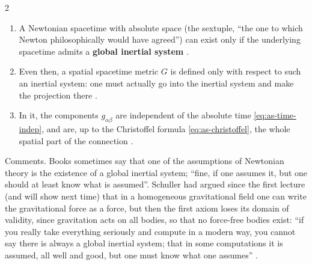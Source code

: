 \begin{paracol}{2}
\begin{theorem}\label{thm:as-summary}
\begin{enumerate}
  \item A Newtonian spacetime with absolute space (the sextuple, ``the one to which Newton philosophically would have agreed'') can exist only if the underlying spacetime admits a \textbf{global inertial system} .
  \item Even then, a spatial spacetime metric $G$ is defined only with respect to such an inertial system: one must actually go into the inertial system and make the projection there .
  \item In it, the components $g_{\alpha\beta}$ are independent of the absolute time \eqref{eq:as-time-indep}, and are, up to the Christoffel formula \eqref{eq:as-christoffel}, the whole spatial part of the connection .
\end{enumerate}
\end{theorem}
Comments. Books sometimes say that one of the assumptions of Newtonian theory is the existence of a global inertial system; ``fine, if one assumes it, but one should at least know what is assumed''. Schuller had argued since the first lecture (and will show next time) that in a homogeneous gravitational field one can write the
gravitational force as a force, but then the first axiom loses its domain of validity, since gravitation acts on all bodies, so that no force-free bodies exist: ``if you really take everything seriously and compute in a modern way, you cannot say there is always a global inertial system; that in some computations it is assumed, all well and good, but
one must know what one assumes'' .


\end{paracol}
